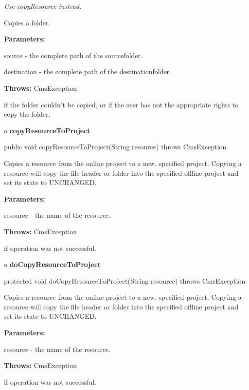 \begin{description}
 {\it Use copyResource
instead.} 

Copies a folder. 

\begin{description}
\item {\bf Parameters:}  

source - the complete path of the sourcefolder.  

destination - the complete path of the destinationfolder.  
\item {\bf Throws:} CmsException  

if the folder couldn't be copied, or if the user has not the appropriate
rights to copy the folder.  
\end{description}

\end{description}

o {\bf copyResourceToProject} 

\begin{PRE}
 public void copyResourceToProject(String resource) throws CmsException
\end{PRE}

\begin{description}
\htmlDD Copies a resource from the online project to a new, specified project.
\htmlBR
Copying a resource will copy the file header or folder into the specified
offline project and set its state to UNCHANGED. 

\begin{description}
\item {\bf Parameters:}  

resource - the name of the resource.  
\item {\bf Throws:} CmsException  

if operation was not successful.  
\end{description}

\end{description}

o {\bf doCopyResourceToProject} 

\begin{PRE}
 protected void doCopyResourceToProject(String resource) throws CmsException
\end{PRE}

\begin{description}
\htmlDD Copies a resource from the online project to a new, specified project.
\htmlBR
Copying a resource will copy the file header or folder into the specified
offline project and set its state to UNCHANGED. 

\begin{description}
\item {\bf Parameters:}  

resource - the name of the resource.  
\item {\bf Throws:} CmsException  

if operation was not successful.  
\end{description}

\end{description}

